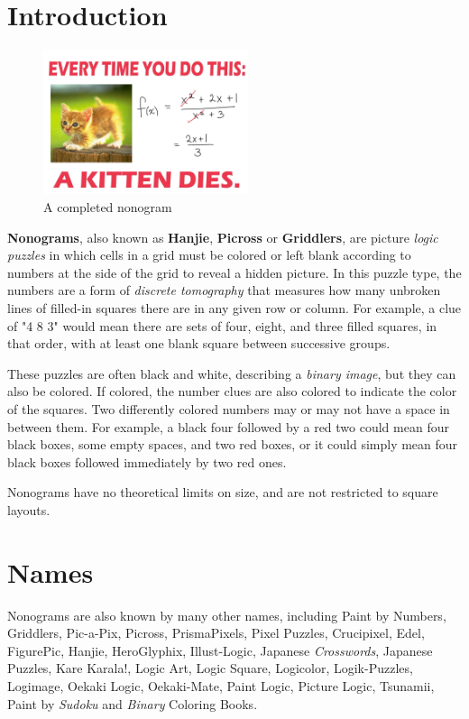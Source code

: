 \chapter*{Introduction}


\begin{figure}
\centering
\includegraphics[width=6cm]{picture/obr.jpg}
\caption{A completed nonogram}
\end{figure}

\textbf{Nonograms}, also known as \textbf{Hanjie}, \textbf{Picross} or \textbf{Griddlers}, are picture \textit{logic puzzles} in which cells in a grid must be colored or left blank according to numbers at the side of the grid to reveal a hidden picture. In this puzzle type, the numbers are a form of \textit{discrete tomography} that measures how many unbroken lines of filled-in squares there are in any given row or column. For example, a clue of "4 8 3" would mean there are sets of four, eight, and three filled squares, in that order, with at least one blank square between successive groups.

These puzzles are often black and white, describing a \textit{binary image}, but they can also be colored. If colored, the number clues are also colored to indicate the color of the squares. Two differently colored numbers may or may not have a space in between them. For example, a black four followed by a red two could mean four black boxes, some empty spaces, and two red boxes, or it could simply mean four black boxes followed immediately by two red ones.

Nonograms have no theoretical limits on size, and are not restricted to square layouts.


\chapter{Names}

Nonograms are also known by many other names, including Paint by Numbers, Griddlers, Pic-a-Pix, Picross, PrismaPixels, Pixel Puzzles, Crucipixel, Edel, FigurePic, Hanjie, HeroGlyphix, Illust-Logic, Japanese \textit{Crosswords}, Japanese Puzzles, Kare Karala!, Logic Art, Logic Square, Logicolor, Logik-Puzzles, Logimage, Oekaki Logic, Oekaki-Mate, Paint Logic, Picture Logic, Tsunamii, Paint by \textit{Sudoku} and \textit{Binary} Coloring Books.


